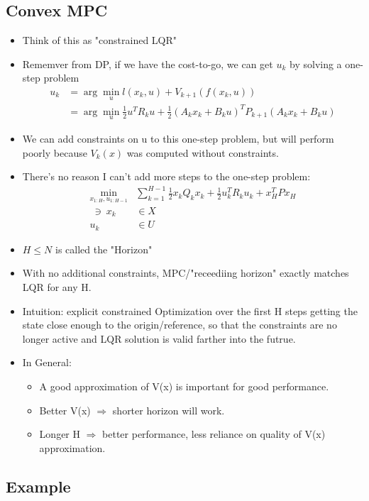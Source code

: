 \subsection{Convex MPC}
\begin{itemize}
    \item Think of this as "constrained LQR"
    \item Rememver from DP, if we have the cost-to-go, we can get $u_k$ by solving a one-step problem
    \begin{align}
    u_k &= \arg\min_u l(x_k, u) + V_{k+1}(f(x_k,u)) \\
    &= \arg\min_u \frac{1}{2} u^TR_k u + \frac{1}{2} (A_k x_k + B_k u)^TP_{k+1}(A_k x_k + B_k u)
    \end{align}
    \item We can add constraints on u to this one-step problem, but will perform poorly because $V_k(x)$ was computed without constraints.
    \item There's no reason I can't add more steps to the one-step problem:
    \begin{align}
        \min_{x_{1:H}, u_{1:H-1}} &\sum_{k=1}^{H-1} \frac{1}{2} x_k Q_k x_k + \frac{1}{2} u_k^T R_k u_k + x_H^T P x_H \\
        \ \ni \ x_k &\in X \\
        u_k &\in U
    \end{align}
    \item $H \leq N$ is called the "Horizon"
    \item With no additional constraints, MPC/"receediing horizon" exactly matches LQR for any H.
    \item Intuition: explicit constrained Optimization over the first H steps getting the state close enough to the origin/reference, so that the constraints are no longer active and LQR solution is valid farther into the futrue.
    \item In General:
    \begin{itemize}
        \item A good approximation of V(x) is important for good performance.
        \item Better V(x) $\Rightarrow$ shorter horizon will work.
        \item Longer H $\Rightarrow$ better performance, less reliance on quality of V(x) approximation.
    \end{itemize}
\end{itemize}

\subsection{Example}

